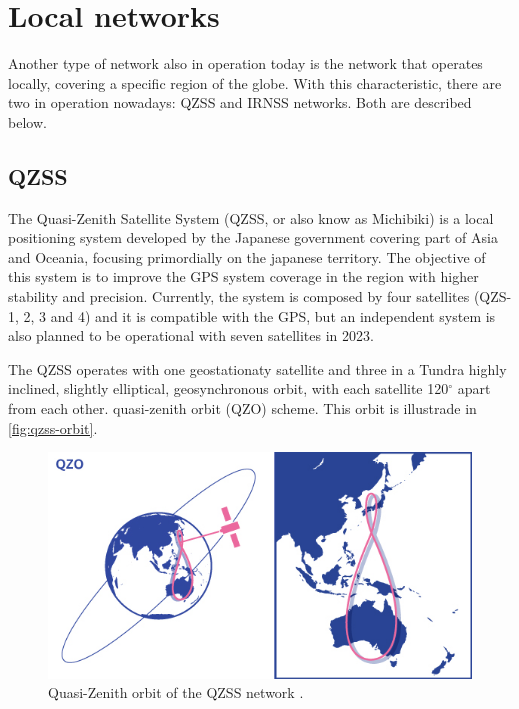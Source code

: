 \section{Local networks}

Another type of network also in operation today is the network that operates locally, covering a specific region of the globe. With this characteristic, there are two in operation nowadays: QZSS and IRNSS networks. Both are described below.

\subsection{QZSS}

The Quasi-Zenith Satellite System \cite{qzss} (QZSS, or also know as Michibiki) is a local positioning system developed by the Japanese government covering part of Asia and Oceania, focusing primordially on the japanese territory. The objective of this system is to improve the GPS system coverage in the region with higher stability and precision. Currently, the system is composed by four satellites (QZS-1, 2, 3 and 4) and it is compatible with the GPS, but an independent system is also planned to be operational with seven satellites in 2023.

The QZSS operates with one geostationaty satellite and three in a Tundra highly inclined, slightly elliptical, geosynchronous orbit, with each satellite 120$^{\circ}$ apart from each other. quasi-zenith orbit (QZO) scheme. This orbit is illustrade in \autoref{fig:qzss-orbit}.

\begin{figure}[!ht]
    \begin{center}
        \includegraphics[width=0.8\columnwidth]{figures/qzss-orbit}
        \caption{Quasi-Zenith orbit of the QZSS network \cite{qzss}.}
        \label{fig:qzss-orbit}
    \end{center}
\end{figure}

